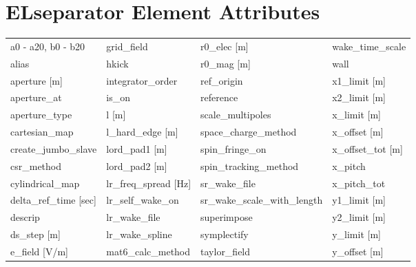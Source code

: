  \section{ELseparator Element Attributes}
 \label{s:list.elseparator}
 
 \begin{tabular}{llll} \toprule
a0 - a20, b0 - b20             & grid_field                     & r0_elec [m]                    & wake_time_scale                \\
alias                          & hkick                          & r0_mag [m]                     & wall                           \\
aperture [m]                   & integrator_order               & ref_origin                     & x1_limit [m]                   \\
aperture_at                    & is_on                          & reference                      & x2_limit [m]                   \\
aperture_type                  & l [m]                          & scale_multipoles               & x_limit [m]                    \\
cartesian_map                  & l_hard_edge [m]                & space_charge_method            & x_offset [m]                   \\
create_jumbo_slave             & lord_pad1 [m]                  & spin_fringe_on                 & x_offset_tot [m]               \\
csr_method                     & lord_pad2 [m]                  & spin_tracking_method           & x_pitch                        \\
cylindrical_map                & lr_freq_spread [Hz]            & sr_wake_file                   & x_pitch_tot                    \\
delta_ref_time [sec]           & lr_self_wake_on                & sr_wake_scale_with_length      & y1_limit [m]                   \\
descrip                        & lr_wake_file                   & superimpose                    & y2_limit [m]                   \\
ds_step [m]                    & lr_wake_spline                 & symplectify                    & y_limit [m]                    \\
e_field [V/m]                  & mat6_calc_method               & taylor_field                   & y_offset [m]                   \\

\end{tabular}
